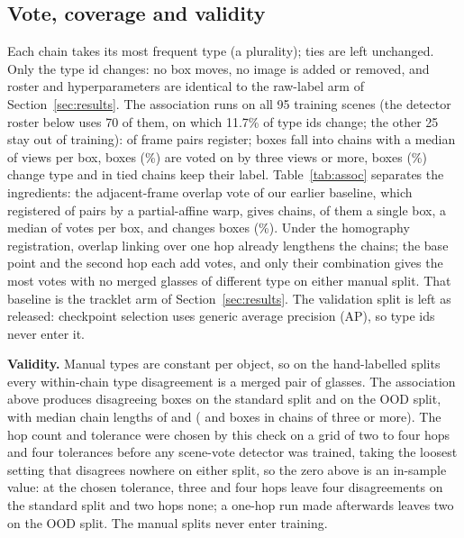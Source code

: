 \documentclass{article}
\begin{document}
\subsection{Vote, coverage and validity}
\label{sec:vote}
Each chain takes its most frequent type (a plurality); ties are left unchanged. Only the type id changes: no box moves, no image is added or removed, and roster and hyperparameters are identical to the raw-label arm of Section~\ref{sec:results}. The association runs on all 95 training scenes (the detector roster below uses 70 of them, on which 11.7\% of type ids change; the other 25 stay out of training): \SceneRegPairs{} of \SceneTriedPairs{} frame pairs register; \ChainBoxes{} boxes fall into \SceneChains{} chains with a median of \SceneMedianLen{} views per box, \SceneBoxesGeThree{} boxes (\SceneBoxesGeThreePct\%) are voted on by three views or more, \SceneChanged{} boxes (\SceneChangedPct\%) change type and \SceneTied{} in tied chains keep their label. Table~\ref{tab:assoc} separates the ingredients: the adjacent-frame overlap vote of our earlier baseline, which registered \ChainFramePairsReg{} of \AdjFramePairs{} pairs by a partial-affine warp, gives \TrkChains{} chains, \TrkSingletons{} of them a single box, a median of \TrkMedianVotes{} votes per box, and changes \TrkChanged{} boxes (\TrkChangedPct\%). Under the homography registration, overlap linking over one hop already lengthens the chains; the base point and the second hop each add votes, and only their combination gives the most votes with no merged glasses of different type on either manual split. That baseline is the tracklet arm of Section~\ref{sec:results}. The validation split is left as released: checkpoint selection uses generic average precision (AP), so type ids never enter it.

\noindent\textbf{Validity.} Manual types are constant per object, so on the hand-labelled splits every within-chain type disagreement is a merged pair of glasses. The association above produces \ManualChainStd{} disagreeing boxes on the standard split and \ManualChainOOD{} on the OOD split, with median chain lengths of \ManualMedianStd{} and \ManualMedianOOD{} (\ManualGeThreeStd{} and \ManualGeThreeOOD{} boxes in chains of three or more). The hop count and tolerance were chosen by this check on a grid of two to four hops and four tolerances before any scene-vote detector was trained, taking the loosest setting that disagrees nowhere on either split, so the zero above is an in-sample value: at the chosen tolerance, three and four hops leave four disagreements on the standard split and two hops none; a one-hop run made afterwards leaves two on the OOD split. The manual splits never enter training.
\end{document}
